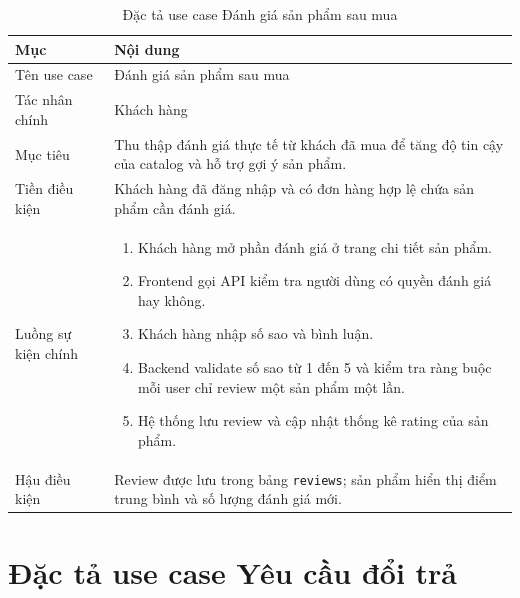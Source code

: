 \documentclass[../DoAn.tex]{subfiles}
\begin{document}
{\normalsize
\setlength{\LTleft}{\fill}
\setlength{\LTright}{\fill}
\setlength{\tabcolsep}{5pt}
\renewcommand{\arraystretch}{1.25}
\begin{longtable}{|p{3.2cm}|p{10.4cm}|}
\caption{Đặc tả use case Đánh giá sản phẩm sau mua}\\
\hline
\textbf{Mục} & \textbf{Nội dung} \\ \hline
Tên use case & Đánh giá sản phẩm sau mua \\ \hline
Tác nhân chính & Khách hàng \\ \hline
Mục tiêu & Thu thập đánh giá thực tế từ khách đã mua để tăng độ tin cậy của catalog và hỗ trợ gợi ý sản phẩm. \\ \hline
Tiền điều kiện & Khách hàng đã đăng nhập và có đơn hàng hợp lệ chứa sản phẩm cần đánh giá. \\ \hline
Luồng sự kiện chính &
\begin{minipage}[t]{10.1cm}
\begin{enumerate}[leftmargin=*,topsep=0pt,itemsep=0pt]
    \item Khách hàng mở phần đánh giá ở trang chi tiết sản phẩm.
    \item Frontend gọi API kiểm tra người dùng có quyền đánh giá hay không.
    \item Khách hàng nhập số sao và bình luận.
    \item Backend validate số sao từ 1 đến 5 và kiểm tra ràng buộc mỗi user chỉ review một sản phẩm một lần.
    \item Hệ thống lưu review và cập nhật thống kê rating của sản phẩm.
\end{enumerate}
\end{minipage} \\ \hline
Hậu điều kiện & Review được lưu trong bảng \texttt{reviews}; sản phẩm hiển thị điểm trung bình và số lượng đánh giá mới. \\ \hline
\end{longtable}
}

\section{Đặc tả use case Yêu cầu đổi trả}
\label{appendix:B.3}
\end{document}
